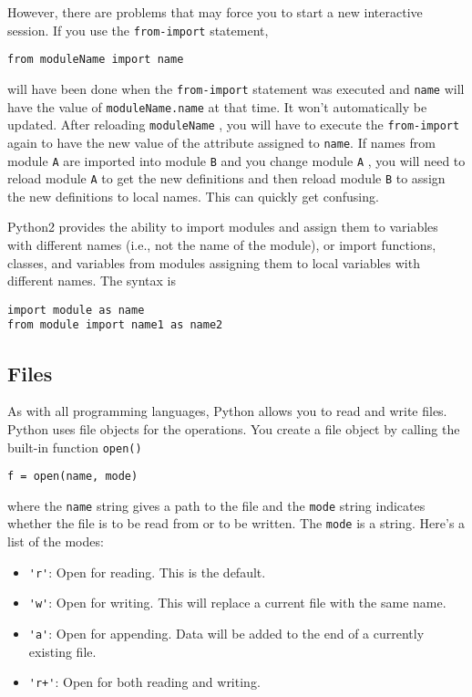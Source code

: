 However, there are problems that
may force you to start a new interactive session. If you use the
\texttt{from-import} statement,

\begin{verbatim}
from moduleName import name
\end{verbatim}


will have been done when the \texttt{from-import} statement was executed
and \texttt{name} will have the value of \texttt{moduleName.name} at that
time. It won't automatically be updated. After reloading
\texttt{moduleName} , you will have to execute the \texttt{from-import}
again to have the new value of the attribute assigned to \texttt{name}.
If names from module \texttt{A} are imported into module \texttt{B} and you
change module \texttt{A} , you will need to reload module \texttt{A} to get
the new definitions and then reload module \texttt{B} to assign the new
definitions to local names. This can quickly get confusing.

Python2 provides the ability to
import modules and assign them to variables with different names (i.e.,
not the name of the module), or import functions, classes, and variables
from modules assigning them to local variables with different names. The
syntax is

\begin{verbatim}
import module as name
from module import name1 as name2
\end{verbatim}

\subsection{Files}

As with all programming languages,
Python allows you to read and write files. Python uses file objects for
the operations. You create a file object by calling the built-in
function \texttt{open()}

\begin{verbatim}
f = open(name, mode)
\end{verbatim}

where the \texttt{name} string gives
a path to the file and the \texttt{mode} string indicates whether the file
is to be read from or to be written. The \texttt{mode} is a string. Here's
a list of the modes:

\begin{itemize}

\item
  \verb"'r'": Open for reading.  This is the default.
\item
  \verb"'w'": Open for writing.
  This will replace a current file with the same name.
\item
  \verb"'a'": Open for appending.
  Data will be added to the end of a currently existing file.
\item
  \verb"'r+'": Open for both reading and writing.
\end{itemize}


